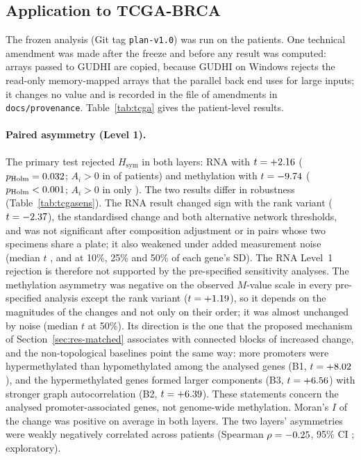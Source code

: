 \subsection{Application to TCGA-BRCA}\label{sec:res-tcga}
The frozen analysis (Git tag \texttt{plan-v1.0}) was run on the \tcgaN{} patients. One technical amendment was made after the freeze and before any result was computed: arrays passed to GUDHI are copied, because GUDHI on Windows rejects the read-only memory-mapped arrays that the parallel back end uses for large inputs; it changes no value and is recorded in the file of amendments in \texttt{docs/provenance}. Table~\ref{tab:tcga} gives the patient-level results.

\paragraph{Paired asymmetry (Level 1).} The primary test rejected $H_{\mathrm{sym}}$ in both layers: RNA with $t=+2.16$ ($p_{\mathrm{Holm}}=0.032$; $A_i>0$ in \AposRna{} of \tcgaN{} patients) and methylation with $t=-9.74$ ($p_{\mathrm{Holm}}<0.001$; $A_i>0$ in only \AposMeth). The two results differ in robustness (Table~\ref{tab:tcgasens}). The RNA result changed sign with the rank variant ($t=-2.37$), the standardised change and both alternative network thresholds, and was not significant after composition adjustment or in pairs whose two specimens share a plate; it also weakened under added measurement noise (median $t$ \noiseTenRna, \noiseTwentyFiveRna{} and \noiseFiftyRna{} at 10\%, 25\% and 50\% of each gene's SD). The RNA Level~1 rejection is therefore not supported by the pre-specified sensitivity analyses. The methylation asymmetry was negative on the observed $M$-value scale in every pre-specified analysis except the rank variant ($t=+1.19$), so it depends on the magnitudes of the changes and not only on their order; it was almost unchanged by noise (median $t$ \noiseFiftyMeth{} at 50\%). Its direction is the one that the proposed mechanism of Section~\ref{sec:res-matched} associates with connected blocks of increased change, and the non-topological baselines point the same way: more promoters were hypermethylated than hypomethylated among the analysed genes (B1, $t=+8.02$), and the hypermethylated genes formed larger components (B3, $t=+6.56$) with stronger graph autocorrelation (B2, $t=+6.39$). These statements concern the \methGenes{} analysed promoter-associated genes, not genome-wide methylation. Moran's $I$ of the change was positive on average in both layers. The two layers' asymmetries were weakly negatively correlated across patients (Spearman $\rho=-0.25$, 95\% CI \crossRhoCI; exploratory).


